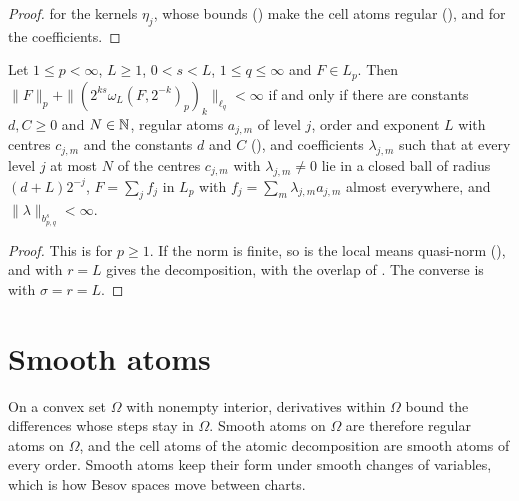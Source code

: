 \begin{proof}
\leanok
{} for the kernels $\eta_j$, whose bounds
() make the cell atoms regular (), and
 for the coefficients.
\end{proof}

\begin{theorem}
\label{thm:atomic-characterisation}
\leanok
{}
Let $1 \leq p < \infty$, $L \geq 1$, $0 < s < L$, $1 \leq q \leq \infty$ and $F \in L_p$. Then
$\|F\|_p + \|(2^{ks} \omega_L(F, 2^{-k})_p)_k\|_{\ell_q} < \infty$ if and only if there are
constants $d, C \geq 0$ and $N \in \mathbb{N}$, regular atoms $a_{j,m}$ of level $j$, order and exponent
$L$ with centres $c_{j,m}$ and the constants $d$ and $C$ (), and
coefficients $\lambda_{j,m}$ such that at every level $j$ at most $N$ of the centres $c_{j,m}$ with
$\lambda_{j,m} \neq 0$ lie in a closed ball of radius $(d + L) 2^{-j}$, $F = \sum_j f_j$ in $L_p$
with $f_j = \sum_m \lambda_{j,m} a_{j,m}$ almost everywhere, and $\|\lambda\|_{b^s_{p,q}} < \infty$.
\end{theorem}

\begin{proof}
\leanok
This is \cite[Theorem 2.6]{SchneiderVybiral} for $p \geq 1$. If the norm is finite, so is the local
means quasi-norm (), and  with $r = L$ gives
the decomposition, with the overlap of . The converse is
 with $\sigma = r = L$.
\end{proof}

\section{Smooth atoms}

On a convex set $\Omega$ with nonempty interior, derivatives within $\Omega$ bound the differences
whose steps stay in $\Omega$. Smooth atoms on $\Omega$ are therefore regular atoms on $\Omega$, and
the cell atoms of the atomic decomposition are smooth atoms of every order. Smooth atoms keep their
form under smooth changes of variables, which is how Besov spaces move between charts.

